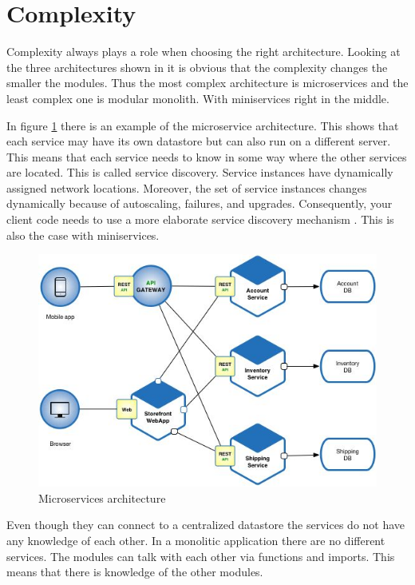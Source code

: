 \section{Complexity}
\label{sec:Complexity}

Complexity always plays a role when choosing the right architecture. Looking at the three architectures shown in  it is obvious that the complexity changes the smaller the modules. Thus the most complex architecture is microservices and the least complex one is modular monolith. With miniservices right in the middle.

In figure \ref{fig:MicroservicesArchitecture} there is an example of the microservice architecture. This shows that each service may have its own datastore but can also run on a different server. This means that each service needs to know in some way where the other services are located. This is called service discovery. Service instances have dynamically assigned network locations. Moreover, the set of service instances changes dynamically because of autoscaling, failures, and upgrades. Consequently, your client code needs to use a more elaborate service discovery mechanism \cite{serviceDiscovery}. This is also the case with miniservices.

\begin{figure}[H]
	\includegraphics[width=\linewidth]{microservice-architecture.png}
        \caption{Microservices architecture}
        \label{fig:MicroservicesArchitecture}
\end{figure}

Even though they can connect to a centralized datastore the services do not have any knowledge of each other. In a monolitic application there are no different services. The modules can talk with each other via functions and imports. This means that there is knowledge of the other modules.

